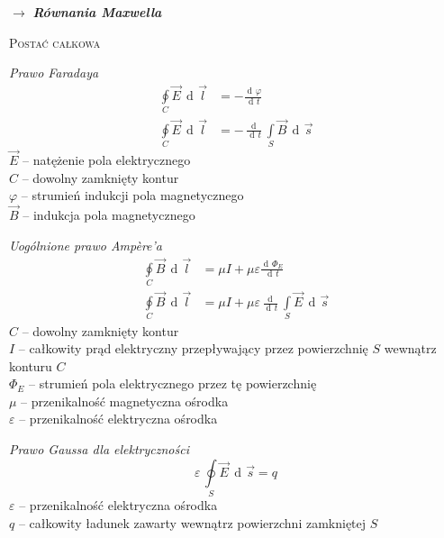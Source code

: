 \documentclass[12pt]{article}
\newenvironment{wzor}[1]{\par{\Large $\longrightarrow$ \textit{#1}}}
    {\newline {\color{grey} \rule{\linewidth}{0.3pt}}}
\DeclareMathOperator{\der}{\operatorname{d}\!}
\begin{document}
\begin{wzor}{\textbf{Równania Maxwella}}
    \par {\large \textsc{Postać całkowa}}
    \par \textit{Prawo Faradaya}
    \begin{equation}
        \begin{split}
            \oint\limits_C \Vec{E} \, \der\Vec{l} &= - \frac{\der\varphi}{\der t}\\
            \oint\limits_C \Vec{E} \, \der\Vec{l}
                &= - \frac{\der}{\der t} \int\limits_S \Vec{B} \, \der\Vec{s}
        \end{split}
    \end{equation}
    $\Vec{E}$ -- natężenie pola elektrycznego\\
    $C$ -- dowolny zamknięty kontur\\
    $\varphi$ -- strumień indukcji pola magnetycznego\\
    $\Vec{B}$ -- indukcja pola magnetycznego
    
    \newpage
    
    \par \textit{Uogólnione prawo Ampère'a}
    \begin{equation}
        \begin{split}
            \oint\limits_C \Vec{B} \, \der\Vec{l}
                &= \mu I + \mu \varepsilon \frac{\der\Phi_E}{\der t}\\
            \oint\limits_C \Vec{B} \, \der\Vec{l}
                &= \mu I + \mu \varepsilon \frac{\der}{\der t} \int\limits_S \Vec{E} \, \der\Vec{s}
        \end{split}
    \end{equation}
    $C$ -- dowolny zamknięty kontur\\
    $I$ -- całkowity prąd elektryczny przepływający przez powierzchnię $S$ wewnątrz konturu $C$\\
    $\Phi_E$ -- strumień pola elektrycznego przez tę powierzchnię\\
    $\mu$ -- przenikalność magnetyczna ośrodka\\
    $\varepsilon$ -- przenikalność elektryczna ośrodka
    
    \par \textit{Prawo Gaussa dla elektryczności}
    \begin{equation}
        \varepsilon \, \oint\limits_S \Vec{E} \, \der\Vec{s} = q
    \end{equation}
    $\varepsilon$ -- przenikalność elektryczna ośrodka\\
    $q$ -- całkowity ładunek zawarty wewnątrz powierzchni zamkniętej $S$
    

\end{wzor}
\end{document}
